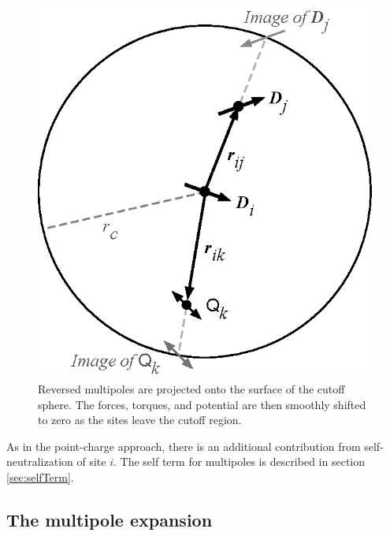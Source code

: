 \begin{figure}[tpb]
  \begin{center}
    \centerline{\includegraphics[scale=0.8]{SM.eps}}
    \caption{Reversed multipoles are projected onto the surface of the
  cutoff sphere. The forces, torques, and potential are then smoothly
  shifted to zero as the sites leave the cutoff region.}
    \label{fig:shiftedMultipoles}
  \end{center}
\end{figure}

As in the point-charge approach, there is an additional contribution
from self-neutralization of site $i$.  The self term for multipoles is
described in section \ref{sec:selfTerm}.

\subsection{The multipole expansion}

